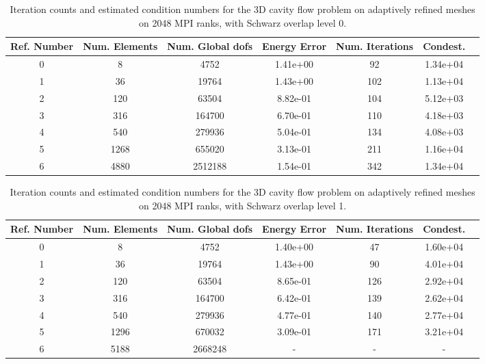 \documentclass[11pt]{amsart}
\begin{document}
\begin{table}
\begin{tabular}{ c  c  c  c  c  c c}
Ref. Number	&Num. Elements	& Num. Global dofs		&Energy Error	&Num. Iterations	&Condest.\\
\hline
0	&8		&4752	&1.41e+00	&92		&1.34e+04\\
1	&36		&19764	&1.43e+00	&102		&1.13e+04\\
2	&120		&63504	&8.82e-01		&104		&5.12e+03\\
3	&316		&164700	&6.70e-01		&110		&4.18e+03\\
4	&540		&279936	&5.04e-01		&134		&4.08e+03\\
5	&1268	&655020	&3.13e-01		&211		&1.16e+04\\
6	&4880	&2512188	&1.54e-01		&342		&1.34e+04\\
\end{tabular}
\caption{Iteration counts and estimated condition numbers for the 3D cavity flow problem on adaptively refined meshes on 2048 MPI ranks, with Schwarz overlap level 0.}
\label{table:stokesConditioningStudyAdaptiveMeshes3DOverlap0}
\end{table}

\begin{table}
\begin{tabular}{ c  c  c  c  c  c c}
Ref. Number	&Num. Elements	& Num. Global dofs		&Energy Error	&Num. Iterations	&Condest.\\
\hline
0	&8		&4752	&1.40e+00	&47	&1.60e+04\\
1	&36		&19764	&1.43e+00	&90	&4.01e+04\\
2	&120		&63504	&8.65e-01		&126	&2.92e+04\\
3	&316		&164700	&6.42e-01		&139	&2.62e+04\\
4	&540		&279936	&4.77e-01		&140	&2.77e+04\\
5	&1296	&670032	&3.09e-01		&171	&3.21e+04\\
6	&5188	&2668248	&-	&-	&-\\
\end{tabular}
\caption{Iteration counts and estimated condition numbers for the 3D cavity flow problem on adaptively refined meshes on 2048 MPI ranks, with Schwarz overlap level 1.}
\label{table:stokesConditioningStudyAdaptiveMeshes3DOverlap1}
\end{table}
\end{document}
